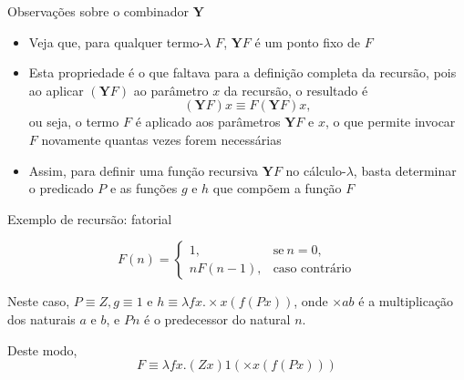 \begin{frame}[fragile]{Observações sobre o combinador $\mathbf{Y}$}

    \begin{itemize}
        \item Veja que, para qualquer termo-$\lambda$ $F$, $\mathbf{Y}F$ é um ponto fixo de $F$

        \item Esta propriedade é o que faltava para a definição completa da recursão, pois
            ao aplicar $(\mathbf{Y}F)$ ao parâmetro $x$ da recursão, o resultado é 
        \[
            (\mathbf{Y}F)x \equiv F(\mathbf{Y}F)x,
        \]
        ou seja, o termo $F$ é aplicado aos parâmetros $\mathbf{Y}F$ e $x$, o que permite invocar
        $F$ novamente quantas vezes forem necessárias

        \item Assim, para definir uma função recursiva $\mathbf{Y}F$ no cálculo-$\lambda$, basta 
        determinar o predicado $P$ e as funções $g$ e $h$ que compõem a função $F$
    \end{itemize}

\end{frame}

\begin{frame}[fragile]{Exemplo de recursão: fatorial}

    \begin{huge}
    \[
        F(n) =  \left\lbrace \begin{array}{ll}
                    1, & \mbox{se}\ n = 0, \\
                    nF(n - 1), & \mbox{caso contrário}
                \end{array} \right.
    \]
    \end{huge}

    \vspace{0.5in}

    Neste caso, $P\equiv Z, g \equiv 1$ e $h\equiv \lambda fx.\times x(f(Px))$, onde
    $\times ab$ é a multiplicação dos naturais $a$ e $b$, e $Pn$ é o predecessor do natural $n$. 

    \vspace{0.1in}
    Deste modo,
    \[
        F \equiv \lambda fx.(Zx)1(\times x(f(Px)))
    \]
\end{frame}

